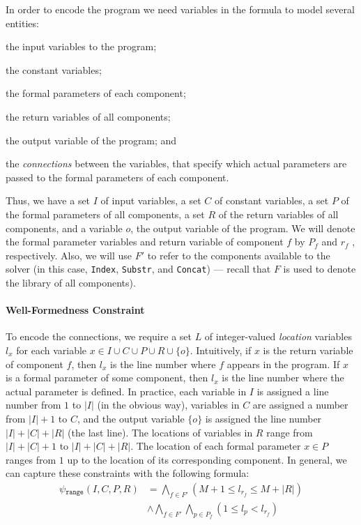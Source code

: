 In order to encode the program we need variables in the formula to model several
entities:
\begin{enumerate*}[(1)]
\item the input variables to the program;
\item the constant variables;
\item the formal parameters of each component;
\item the return variables of all components;
\item the output variable of the program; and
\item the \textit{connections} between the variables, that specify which
  actual parameters are passed to the formal parameters of each component.
\end{enumerate*}
Thus, we have a set $I$ of input variables, a set $C$ of constant variables, a
set $P$ of the formal parameters of all components, a set $R$ of the return
variables of all components, and a variable $o$, the output variable of the
program. We will denote the formal parameter variables and return variable of
component $f$ by $P_f$ and $r_f$ , respectively. Also, we will use $F'$ to refer
to the components available to the solver (in this case, \lstinline{Index},
\lstinline{Substr}, and \lstinline{Concat}) --- recall that $F$ is used to
denote the library of all components).

\paragraph{Well-Formedness Constraint}
\label{sec:wfp-constraint}

To encode the connections, we require a set $L$ of integer-valued
\textit{location} variables $l_x$ for each variable $x \in I \cup C \cup P \cup
R \cup \{o\}$. Intuitively, if $x$ is the return variable of component $f$, then
$l_x$ is the line number where $f$ appears in the program. If $x$ is a formal
parameter of some component, then $l_x$ is the line number where the actual
parameter is defined. In practice, each variable in $I$ is assigned a line
number from $1$ to $|I|$ (in the obvious way), variables in $C$ are assigned
a number from $|I| + 1$ to $C$, and the output variable $\{o\}$ is assigned the
line number $|I| + |C| + |R|$ (the last line). The locations of variables in $R$
range from $|I| + |C| + 1$ to $|I| + |C| + |R|$. The location of each formal
parameter $x \in P$ ranges from $1$ up to the location of its corresponding
component.
In general, we can capture these constraints with the following formula:
%
\begin{align*}
  \psi{}_{\mathtt{range}}(I, C, P, R) &=
  \bigwedge_{f \in F'} (M + 1 \leq l_{r_f} \leq M + |R|)\\
  &\wedge
  \bigwedge_{f \in F'}
  \bigwedge_{p \in P_f} (1 \leq l_p < l_{r_f})
\end{align*}

